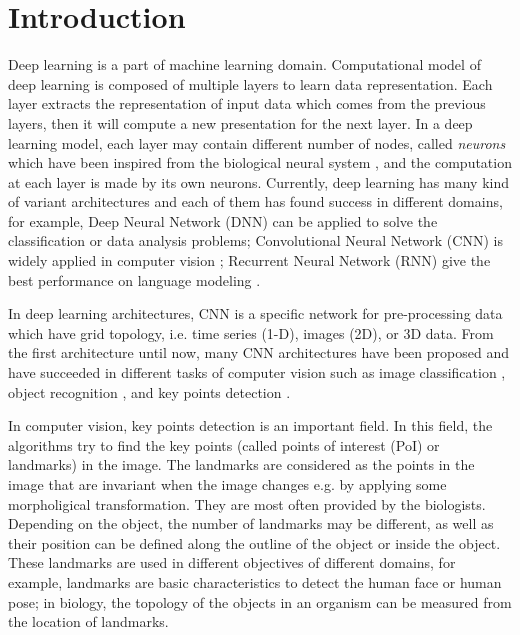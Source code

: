 \documentclass[review]{elsarticle}
\begin{document}
\linenumbers

\section{Introduction}
\label{sIntroduction}
Deep learning is a part of machine learning domain. Computational model of deep learning is composed of multiple layers to learn data representation. Each layer extracts the representation of input data which comes from the previous layers, then it will compute a new presentation for the next layer. In a deep learning model, each layer may contain different number of nodes, called \textit{neurons} which have been inspired from the biological neural system \cite{}, and the computation at each layer is made by its own neurons. Currently, deep learning has many kind of variant architectures and each of them has found success in different domains, for example,  Deep Neural Network (DNN) can be applied to solve the classification or data analysis problems\cite{hinton2012deep, mikolov2011strategies}; Convolutional Neural Network (CNN) is widely applied in computer vision \cite{lecun1998gradient, krizhevsky2012imagenet,szegedy2015going}; Recurrent Neural Network (RNN) give the best performance on language modeling \cite{jean2014using, sutskever2014sequence,lecun2015deep, collobert2011natural}.

In deep learning architectures, CNN is a specific network for pre-processing data which have grid topology, i.e. time series (1-D), images (2D), or 3D data. From the first architecture \cite{lecun1998gradient} until now, many CNN architectures have been proposed and have succeeded in different tasks of computer vision such as image classification \cite{lecun1998gradient, krizhevsky2012imagenet,szegedy2015going}, object recognition \cite{szegedy2015going,farabet2013learning,li2015convolutional}, and key points detection \cite{liu2016fashion, sun2013deep, zhang2014facial, cintas2016automatic}.

In computer vision, key points detection is an important field. In this field, the algorithms try to find the key points (called points of interest (PoI) or landmarks) in the image. The landmarks are considered as the points in the image that are invariant when the image changes e.g. by applying some morpholigical transformation. They are most often provided by the biologists. Depending on the object, the number of landmarks may be different, as well as their position can be defined along the outline of the object or inside the object. These landmarks are used in different objectives of different domains, for example, landmarks are basic characteristics to detect the human face or human pose; in biology, the topology of the objects in an organism can be measured from the location of landmarks.
\end{document}
